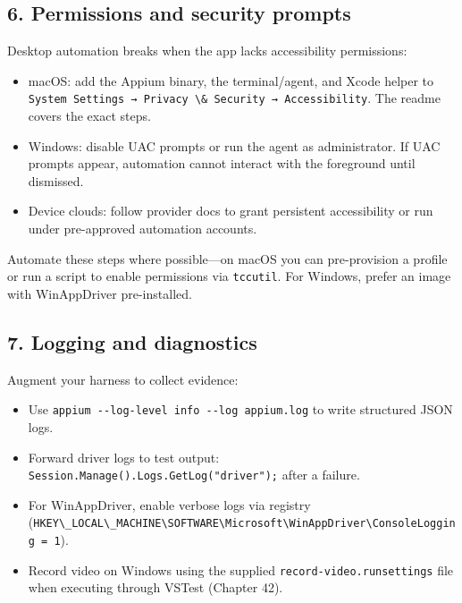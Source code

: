\subsection{6. Permissions and security
prompts}\label{permissions-and-security-prompts}

Desktop automation breaks when the app lacks accessibility permissions:

\begin{itemize}
\tightlist
\item
  macOS: add the Appium binary, the terminal/agent, and Xcode helper to
  \passthrough{\lstinline!System Settings → Privacy \& Security → Accessibility!}.
  The readme covers the exact steps.
\item
  Windows: disable UAC prompts or run the agent as administrator. If UAC
  prompts appear, automation cannot interact with the foreground until
  dismissed.
\item
  Device clouds: follow provider docs to grant persistent accessibility
  or run under pre-approved automation accounts.
\end{itemize}

Automate these steps where possible---on macOS you can pre-provision a
profile or run a script to enable permissions via
\passthrough{\lstinline!tccutil!}. For Windows, prefer an image with
WinAppDriver pre-installed.

\subsection{7. Logging and diagnostics}\label{logging-and-diagnostics}

Augment your harness to collect evidence:

\begin{itemize}
\tightlist
\item
  Use \passthrough{\lstinline!appium --log-level info --log appium.log!}
  to write structured JSON logs.
\item
  Forward driver logs to test output:
  \passthrough{\lstinline!Session.Manage().Logs.GetLog("driver");!}
  after a failure.
\item
  For WinAppDriver, enable verbose logs via registry
  (\passthrough{\lstinline!HKEY\_LOCAL\_MACHINE\\SOFTWARE\\Microsoft\\WinAppDriver\\ConsoleLogging = 1!}).
\item
  Record video on Windows using the supplied
  \passthrough{\lstinline!record-video.runsettings!} file when executing
  through VSTest (Chapter 42).
\end{itemize}

